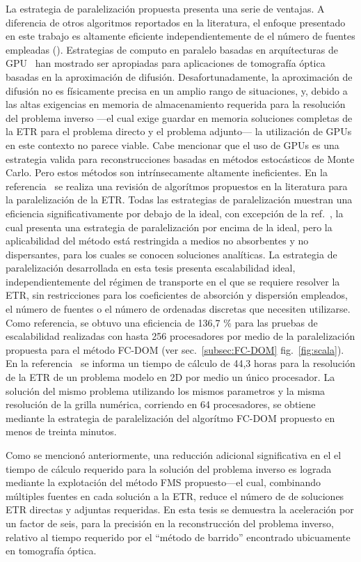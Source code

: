 La estrategia de paralelización propuesta presenta una serie de
ventajas. A diferencia de otros algoritmos reportados en la literatura, el enfoque
presentado en este trabajo es altamente eficiente independientemente de
el número de fuentes empleadas (\cf \cite{Hielscher2004}).
Estrategias de computo en paralelo basadas en arquítecturas de GPU~\cite {Doulgerakis2017} han mostrado ser apropiadas para aplicaciones de tomografía óptica basadas en la aproximación de difusión. Desafortunadamente, 
la aproximación de difusión no es físicamente precisa en un amplio rango de situaciones,
y, debido a las altas exigencias en memoria de almacenamiento requerida para 
la resolución del problema inverso ---el cual exige guardar en memoria soluciones completas 
de la ETR para el problema 
directo y el problema adjunto--- la utilización de GPUs en este contexto no parece viable. 
Cabe mencionar que el uso de GPUs es una estrategia valida para reconstrucciones 
basadas en métodos estocásticos de Monte Carlo. Pero estos métodos son intrínsecamente 
altamente ineficientes. En la 
referencia~\cite{Coelho2014} se realiza una revisión de algorítmos propuestos en la literatura 
para la paralelización de la ETR. Todas las estrategias de paralelización muestran una eficiencia significativamente por debajo de la ideal, con excepción de la ref.~\cite {Colomer2013}, la cual presenta una estrategia de paralelización 
por encima de la ideal, pero
la aplicabilidad del método está restringida a medios no absorbentes y no dispersantes, 
para los cuales se conocen soluciones analíticas. La estrategia de paralelización 
desarrollada en esta tesis presenta escalabilidad ideal, independientemente 
del régimen de transporte en el que se requiere resolver la ETR, sin restricciones 
para los coeficientes de absorción y dispersión empleados, el número de fuentes o el número de ordenadas discretas que necesiten utilizarse. Como referencia, se obtuvo una eficiencia de 136,7 \% para las pruebas de escalabilidad realizadas con hasta 256 procesadores por
medio de la paralelización propuesta para el método FC-DOM (ver sec.~\ref{subsec:FC-DOM} fig.~\ref{fig:scala}). En la referencia~\cite [p. 153]{Fujii2014} 
se informa un tiempo de cálculo de 44,3 horas para la resolución de la ETR de un problema modelo 
en 2D por medio un único procesador. La solución del mismo problema utilizando 
los mismos parametros y la misma resolución de la grilla numérica, corriendo en 64 procesadores, se obtiene mediante la estrategia de paralelización del algorítmo FC-DOM propuesto en menos de treinta minutos.

Como se mencionó anteriormente, una reducción adicional significativa en el
el tiempo de cálculo requerido para la solución del problema inverso es
lograda mediante la explotación del método FMS propuesto---el cual, combinando
múltiples fuentes en cada solución a la ETR, reduce el número de
de soluciones ETR directas y adjuntas requeridas. 
En esta tesis se demuestra la aceleración por un factor de seis, 
para la precisión en la reconstrucción del problema inverso,
relativo al tiempo requerido por el ``método de barrido'' 
encontrado ubicuamente en tomografía óptica.


